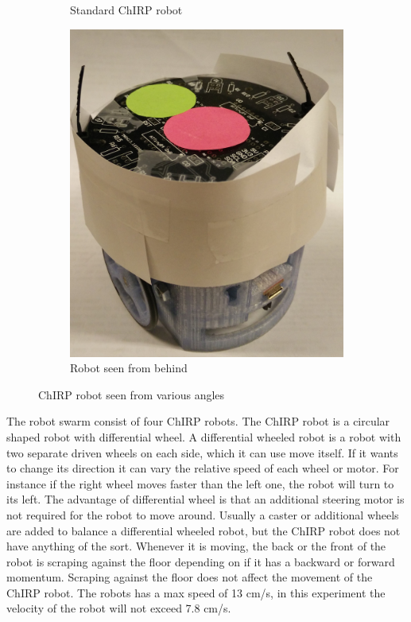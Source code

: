 \begin{figure}[H]
\begin{subfigure}[b]{0.3\textwidth}
        \caption{Standard ChIRP robot}
        \label{fig:robot1}
    \end{subfigure}
    \hfill
    \begin{subfigure}[b]{0.3\textwidth}
        \centering
        \includegraphics[width=\textwidth]{figs/robot3}
        \caption{Robot seen from behind}
        \label{fig:robot3}
    \end{subfigure}
    \caption[ChIRP robot]{ChIRP robot seen from various angles}
    \label{fig:robot}
\end{figure}


The robot swarm consist of four ChIRP robots. The ChIRP robot is a circular shaped robot with differential wheel. A differential wheeled robot is a robot with two separate driven wheels on each side, which it can use move itself. If it wants to change its direction it can vary the relative speed of each wheel or motor. For instance if the right wheel moves faster than the left one, the robot will turn to its left.
The advantage of differential wheel is that an additional steering motor is not required for the robot to move around. Usually a caster or additional wheels are added to balance a differential wheeled robot, but the ChIRP robot does not have anything of the sort. Whenever it is moving, the back or the front of the robot is scraping against the floor depending on if it has a backward or forward momentum. Scraping against the floor does not affect the movement of the ChIRP robot. The robots has a max speed of 13 cm/s, in this experiment the velocity of the robot will not exceed 7.8 cm/s. 

